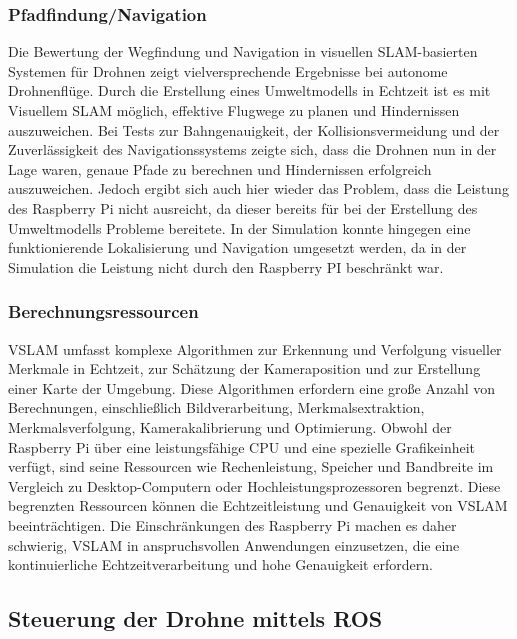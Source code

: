 \subsubsection{Pfadfindung/Navigation}

Die Bewertung der Wegfindung und Navigation in visuellen SLAM-basierten Systemen für Drohnen zeigt vielversprechende Ergebnisse bei autonome Drohnenflüge. Durch die Erstellung eines Umweltmodells in Echtzeit ist es mit Visuellem SLAM möglich, effektive Flugwege zu planen und Hindernissen auszuweichen. Bei Tests zur Bahngenauigkeit, der Kollisionsvermeidung und der Zuverlässigkeit des Navigationssystems zeigte sich, dass die Drohnen nun in der Lage waren, genaue Pfade zu berechnen und Hindernissen erfolgreich auszuweichen. Jedoch ergibt sich auch hier wieder das Problem, dass die Leistung des Raspberry Pi nicht ausreicht, da dieser bereits für bei der Erstellung des Umweltmodells Probleme bereitete. In der Simulation konnte hingegen eine funktionierende Lokalisierung und Navigation umgesetzt werden, da in der Simulation die Leistung nicht durch den Raspberry PI beschränkt war.

\subsubsection{Berechnungsressourcen}
\ac{VSLAM} umfasst komplexe Algorithmen zur Erkennung und Verfolgung visueller Merkmale in Echtzeit, zur Schätzung der Kameraposition und zur Erstellung einer Karte der Umgebung. Diese Algorithmen erfordern eine große Anzahl von Berechnungen, einschließlich Bildverarbeitung, Merkmalsextraktion, Merkmalsverfolgung, Kamerakalibrierung und Optimierung. Obwohl der Raspberry Pi über eine leistungsfähige CPU und eine spezielle Grafikeinheit verfügt, sind seine Ressourcen wie Rechenleistung, Speicher und Bandbreite im Vergleich zu Desktop-Computern oder Hochleistungsprozessoren begrenzt. Diese begrenzten Ressourcen können die Echtzeitleistung und Genauigkeit von \ac{VSLAM} beeinträchtigen. Die Einschränkungen des Raspberry Pi machen es daher schwierig, \ac{VSLAM} in anspruchsvollen Anwendungen einzusetzen, die eine kontinuierliche Echtzeitverarbeitung und hohe Genauigkeit erfordern.

\subsection{Steuerung der Drohne mittels ROS}\label{steuerung_drohne_ros:subsection}

